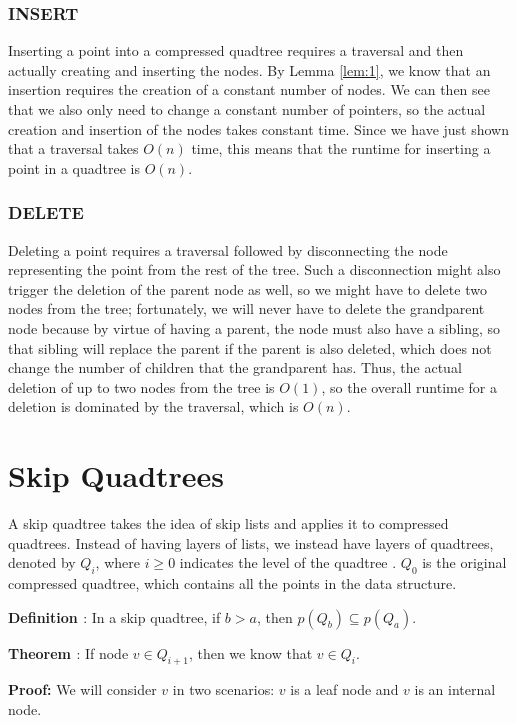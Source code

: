 \documentclass[12pt]{article}
\newcounter{theorem}
\newcommand{\theorem}[0]{\textbf{Theorem \refstepcounter{theorem}\thetheorem\label{thm:\thetheorem}}}
\newcounter{defn}
\newcommand{\defn}[0]{\textbf{Definition \refstepcounter{defn}\thedefn\label{def:\thedefn}}}
\begin{document}
        \subsubsection{INSERT}
            Inserting a point into a compressed quadtree requires a traversal and then actually creating and inserting the nodes. By Lemma \ref{lem:1}, we know that an insertion requires the creation of a constant number of nodes. We can then see that we also only need to change a constant number of pointers, so the actual creation and insertion of the nodes takes constant time. Since we have just shown that a traversal takes $O(n)$ time, this means that the runtime for inserting a point in a quadtree is $O(n)$.
            
        \subsubsection{DELETE}
            Deleting a point requires a traversal followed by disconnecting the node representing the point from the rest of the tree. Such a disconnection might also trigger the deletion of the parent node as well, so we might have to delete two nodes from the tree; fortunately, we will never have to delete the grandparent node because by virtue of having a parent, the node must also have a sibling, so that sibling will replace the parent if the parent is also deleted, which does not change the number of children that the grandparent has. Thus, the actual deletion of up to two nodes from the tree is $O(1)$, so the overall runtime for a deletion is dominated by the traversal, which is $O(n)$.
        
    \section{Skip Quadtrees}
        A skip quadtree takes the idea of skip lists and applies it to compressed quadtrees. Instead of having layers of lists, we instead have layers of quadtrees, denoted by $Q_i$, where $i \geq 0$ indicates the level of the quadtree \cite{sqt}. $Q_0$ is the original compressed quadtree, which contains all the points in the data structure.
        
        \defn: In a skip quadtree, if $b > a$, then $p(Q_b) \subseteq p(Q_a)$.
        
        \theorem: If node $v \in Q_{i+1}$, then we know that $v \in Q_i$.
        
        \textbf{Proof:} We will consider $v$ in two scenarios: $v$ is a leaf node and $v$ is an internal node.
        
\end{document}
